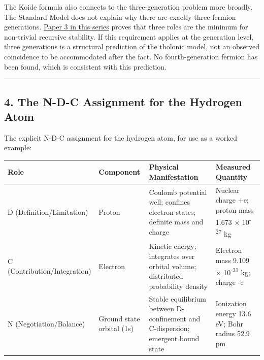\documentclass[
  11pt,
  letterpaper,
]{article}
\begin{document}
The Koide formula also connects to the three-generation problem more
broadly. The Standard Model does not explain why there are exactly three
fermion generations.
\href{https://github.com/baardev/truevalue/blob/main/docnav/Research/papers/3_minimal-recursive-triadic-framework/3_minimal-recursive-triadic-framework.pdf}{Paper
3 in this series} proves that three roles are the minimum for
non-trivial recursive stability. If this requirement applies at the
generation level, three generations is a structural prediction of the
tholonic model, not an observed coincidence to be accommodated after the
fact. No fourth-generation fermion has been found, which is consistent
with this prediction.

\begin{center}\rule{0.5\linewidth}{0.5pt}\end{center}

\subsection{4. The N-D-C Assignment for the Hydrogen
Atom}\label{the-n-d-c-assignment-for-the-hydrogen-atom}

The explicit N-D-C assignment for the hydrogen atom, for use as a worked
example:

\begin{longtable}[]{@{}
  >{\raggedright\arraybackslash}p{}
  >{\raggedright\arraybackslash}p{}
  >{\raggedright\arraybackslash}p{}
  >{\raggedright\arraybackslash}p{}@{}}
\toprule\noalign{}
\begin{minipage}[b]{\linewidth}\raggedright
Role
\end{minipage} & \begin{minipage}[b]{\linewidth}\raggedright
Component
\end{minipage} & \begin{minipage}[b]{\linewidth}\raggedright
Physical Manifestation
\end{minipage} & \begin{minipage}[b]{\linewidth}\raggedright
Measured Quantity
\end{minipage} \\
\midrule\noalign{}
\endhead
\bottomrule\noalign{}
\endlastfoot
D (Definition/Limitation) & Proton & Coulomb potential well; confines
electron states; definite mass and charge & Nuclear charge +e; proton
mass 1.673 × 10\textsuperscript{-27} kg \\
C (Contribution/Integration) & Electron & Kinetic energy; integrates
over orbital volume; distributed probability density & Electron mass
9.109 × 10\textsuperscript{-31} kg; charge -e \\
N (Negotiation/Balance) & Ground state orbital (1s) & Stable equilibrium
between D-confinement and C-dispersion; emergent bound state &
Ionization energy 13.6 eV; Bohr radius 52.9 pm \\
\end{longtable}
\end{document}
